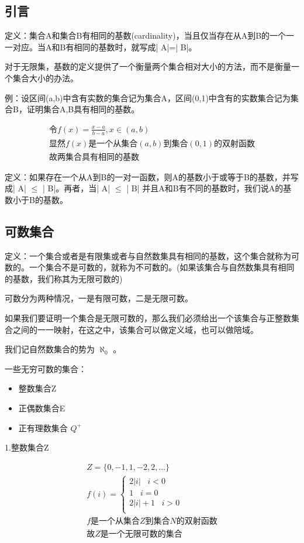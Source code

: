 \documentclass[12pt,a4paper,oneside]{ctexart}
\begin{document}
\subsection*{引言}

定义：集合A和集合B有相同的基数(cardinality)，当且仅当存在从A到B的一个一一对应。当A和B有相同的基数时，就写成| A|=| B|。

对于无限集，基数的定义提供了一个衡量两个集合相对大小的方法，而不是衡量一个集合大小的办法。

例：设区间(a,b)中含有实数的集合记为集合A，区间(0,1)中含有的实数集合记为集合B，证明集合A,B具有相同的基数。

\[\begin{gathered}
\text{令}f(x)=\frac{x-a}{b-a},x\in(a,b)\\
\text{显然}f(x)\text{是一个从集合}(a,b)\text{到集合}(0,1)\text{的双射函数}\\
\text{故两集合具有相同的基数}
\end{gathered}\]

定义：如果存在一个从A到B的一对一函数，则A的基数小于或等于B的基数，并写成| A| \(\leqslant\) | B|。再者，当| A| \(\leqslant\) | B| 并且A和B有不同的基数时，我们说A的基数小于B的基数。

\subsection*{可数集合}

定义：一个集合或者是有限集或者与自然数集具有相同的基数，这个集合就称为可数的。一个集合不是可数的，就称为不可数的。(如果该集合与自然数集具有相同的基数，我们称其为无限可数的)

可数分为两种情况，一是有限可数，二是无限可数。

如果我们要证明一个集合是无限可数的，那么我们必须给出一个该集合与正整数集合之间的一一映射，在这之中，该集合可以做定义域，也可以做陪域。

我们记自然数集合的势为 \(\aleph_0\) 。

一些无穷可数的集合：

\begin{itemize}
\item
  整数集合Z
\item
  正偶数集合E
\item
  正有理数集合 \(Q^+\)
\end{itemize}

1.整数集合Z

\[\begin{gathered}
Z=\{0,-1,1,-2,2,...\}\\
f(i)=
\begin{cases}
2|i|\;\;\;i<0\\
1\;\;\;i=0\\
2|i|+1\;\;\;i>0\\
\end{cases}\\
f\text{是一个从集合}Z\text{到集合}N\text{的双射函数}\\
\text{故}Z\text{是一个无限可数的集合}
\end{gathered}\]
\end{document}
